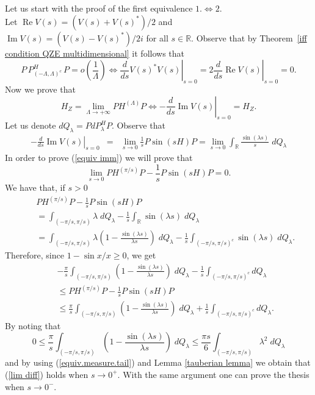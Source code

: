 \documentclass[aip,jmp
]{revtex4}
\renewcommand{\Re}{\mathop{\mathrm{Re}}\nolimits}
\renewcommand{\Im}{\mathop{\mathrm{Im}}\nolimits}
\newcommand{\RM}{\mathbb{R}}
\theoremstyle{definition}
\begin{document}
Let us start with the proof of the first equivalence $1. \Leftrightarrow 2.$\\
Let $\Re V(s)= (V(s)+V(s)^*)/2$ and $\Im V(s)= (V(s)-V(s)^*)/2 i$ for all $s \in \RM$.
Observe that by Theorem~\ref{iff condition QZE multidimensional} it follows that
\begin{equation}\label{equiv.measure.tail}
P\,P_{(-\Lambda,\Lambda)^c}^H\, P = o\left( \frac{1}{\Lambda} \right) \Leftrightarrow \left.\frac{d}{ds}V(s)^* V(s)\right|_{s=0}=2\left.\frac{d}{ds}\Re  V(s)\right|_{s=0}=0.
\end{equation}
Now we prove that
\begin{equation}\label{equiv imm}
H_{Z}=\lim_{\Lambda \to +\infty} PH^{(\Lambda)}P
\Leftrightarrow -\left.\frac{d}{ds}\Im V(s)\right|_{s=0}=H_{Z}.
\end{equation}
Let us denote $dQ_{\lambda}=PdP^{H}_{\lambda}P$.
Observe that
\begin{eqnarray*}
-\left.\frac{d}{ds} \Im V(s)\right|_{s=0} & = & \lim_{s \to 0} \frac{1}{s}P\sin(sH)P
                            = \lim_{s \to 0} \int_{\RM} \frac{\sin(\lambda s)}{s}\;dQ_{\lambda}
\end{eqnarray*}
In order to prove (\ref{equiv imm}) we will prove that
\begin{equation}\label{lim diff}
\lim_{s \to 0} PH^{(\pi/s)}P-\frac{1}{s}P\sin(sH)P= 0.
\end{equation}
We have that, if $s>0$
\begin{eqnarray*}
& & PH^{(\pi/s)}P-\frac{1}{s}P\sin(sH)P \\
& & = \int_{(-\pi/s,\pi/s)} \lambda \;dQ_{\lambda} - \frac{1}{s} \int_{\RM} \sin(\lambda s)\; dQ_{\lambda} \\
& & = \int_{(-\pi/s,\pi/s)} \lambda \left(1-\frac{\sin(\lambda s)}{\lambda s}\right)\; dQ_{\lambda}-\frac{1}{s} \int_{(-\pi/s, \pi/s)^c} \sin(\lambda s)\; dQ_{\lambda} .
\end{eqnarray*}
Therefore, since $1-\sin x/ x\geq 0$, we get
\begin{eqnarray*}
& & -\frac{\pi}{s} \int_{(-\pi/s,\pi/s)} \left(1-\frac{\sin(\lambda s)}{\lambda s}\right)\; dQ_{\lambda}-\frac{1}{s} \int_{(-\pi/s, \pi/s)^c}  dQ_{\lambda} \\
& & \leq  PH^{(\pi/s)}P-\frac{1}{s}P\sin(sH)P \\
& & \leq \frac{\pi}{s} \int_{(-\pi/s,\pi/s)} \left(1-\frac{\sin(\lambda s)}{\lambda s}\right)\; dQ_{\lambda}+\frac{1}{s} \int_{(-\pi/s, \pi/s)^c} dQ_{\lambda}.
\end{eqnarray*}
By noting that
$$
0 \leq \frac{\pi}{s}\int_{(-\pi/s, \pi/s)}\left(1-\frac{\sin(\lambda s)}{\lambda s}\right)\; dQ_{\lambda} \leq \frac{\pi s}{6} \int_{(-\pi/s, \pi/s)} \lambda^2 \; dQ_{\lambda}
$$
and by using (\ref{equiv.measure.tail}) and Lemma \ref{tauberian lemma} we obtain that (\ref{lim diff}) holds when $s\to 0^+$.
With the same argument one can prove the thesis when $s\to 0^-$.
\end{document}
